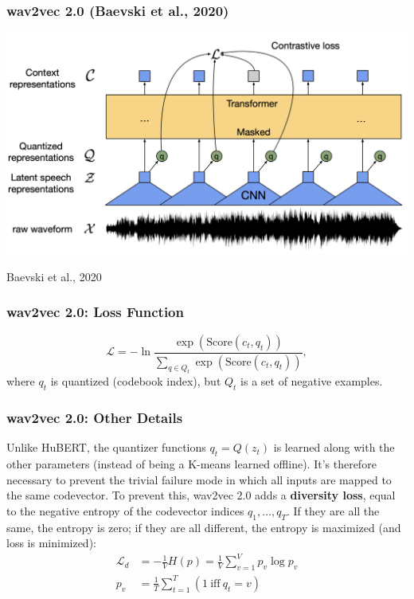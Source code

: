 \documentclass{beamer}
\begin{document}
\begin{frame}
  \frametitle{wav2vec 2.0 (Baevski et al., 2020)}

  \centerline{\includegraphics[width=\textwidth]{figs/baevski2020fig1.png}}

  \centerline{\tiny Baevski et al., 2020}
\end{frame}

\begin{frame}
  \frametitle{wav2vec 2.0: Loss Function}

  \begin{displaymath}
    {\mathcal L}=-\ln\frac{\exp\left(\text{Score}(c_t,q_t)\right)}{\sum_{q\in Q_t}\exp\left(\text{Score}(c_t,q_t)\right)},
  \end{displaymath}
  where $q_t$ is quantized (codebook index), but $Q_t$ is a set of negative examples.
\end{frame}

\begin{frame}
  \frametitle{wav2vec 2.0: Other Details}

  Unlike HuBERT, the quantizer functions $q_t=Q(z_t)$ is learned along
  with the other parameters (instead of being a K-means learned
  offline).  It's therefore necessary to prevent the trivial failure
  mode in which all inputs are mapped to the same codevector.  To
  prevent this, wav2vec 2.0 adds a {\bf diversity loss}, equal to the negative
  entropy of the codevector indices $q_1,\ldots,q_T$.  If they are all
  the same, the entropy is zero; if they are all different, the
  entropy is maximized (and loss is minimized):
  \begin{align*}
    {\mathcal L}_d &= -\frac{1}{V}H(p) = \frac{1}{V}\sum_{v=1}^V p_v\log p_v\\
    p_v &= \frac{1}{T}\sum_{t=1}^T \left(1~\text{iff}~q_t=v\right)
  \end{align*}
  
\end{frame}
\end{document}
